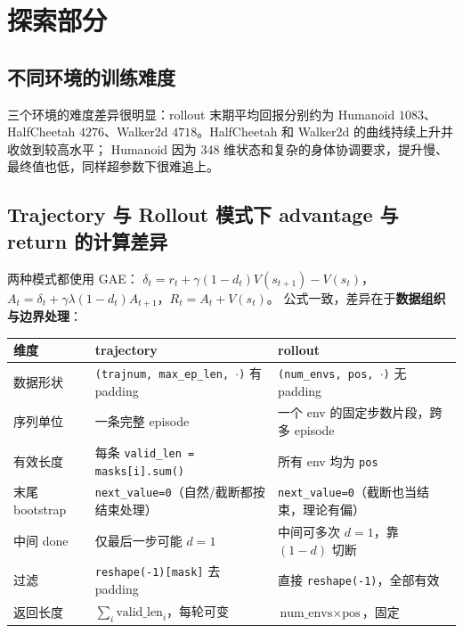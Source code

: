 \documentclass[12pt]{article}
\begin{document}
\section{探索部分}

\subsection{不同环境的训练难度}

三个环境的难度差异很明显：rollout 末期平均回报分别约为 Humanoid $1083$、
HalfCheetah $4276$、Walker2d $4718$。HalfCheetah 和 Walker2d 的曲线持续上升并收敛到较高水平；
Humanoid 因为 348 维状态和复杂的身体协调要求，提升慢、最终值也低，同样超参数下很难追上。

\subsection{Trajectory 与 Rollout 模式下 advantage 与 return 的计算差异}

两种模式都使用 GAE：
$\delta_t = r_t + \gamma(1-d_t)V(s_{t+1}) - V(s_t)$，
$A_t = \delta_t + \gamma\lambda(1-d_t)A_{t+1}$，$R_t=A_t+V(s_t)$。
公式一致，差异在于\textbf{数据组织与边界处理}：

\begin{table}[H]
\centering
\small
\renewcommand{\arraystretch}{1.15}
\begin{tabular}{lll}
\toprule
维度 & trajectory & rollout \\
\midrule
数据形状 & \texttt{(trajnum, max\_ep\_len, $\cdot$)} 有 padding & \texttt{(num\_envs, pos, $\cdot$)} 无 padding \\
序列单位 & 一条完整 episode & 一个 env 的固定步数片段，跨多 episode \\
有效长度 & 每条 \texttt{valid\_len = masks[i].sum()} & 所有 env 均为 \texttt{pos} \\
末尾 bootstrap & \texttt{next\_value=0}（自然/截断都按结束处理） & \texttt{next\_value=0}（截断也当结束，理论有偏） \\
中间 done & 仅最后一步可能 $d=1$ & 中间可多次 $d=1$，靠 $(1{-}d)$ 切断 \\
过滤 & \texttt{reshape(-1)[mask]} 去 padding & 直接 \texttt{reshape(-1)}，全部有效 \\
返回长度 & $\sum_i \text{valid\_len}_i$，每轮可变 & $\text{num\_envs}\times\text{pos}$，固定 \\
\bottomrule
\end{tabular}
\end{table}
\end{document}
